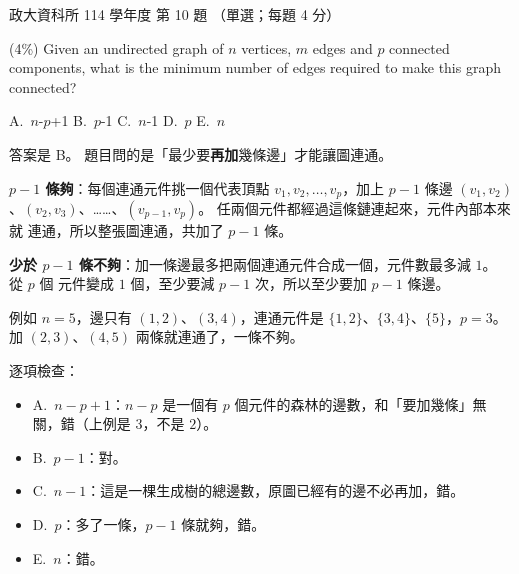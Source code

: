 \begin{pastexam}[label={px:nccu-114-dsa-10}]{政大資科所 114 學年度 第 10 題}
（單選；每題 4 分）

(4\%) Given an undirected graph of $n$ vertices, $m$ edges and $p$ connected components, what is
the minimum number of edges required to make this graph connected?

A.~$n$-$p$+1 \qquad B.~$p$-1 \qquad C.~$n$-1 \qquad D.~$p$ \qquad E.~$n$
\end{pastexam}

\begin{pastsoln}
答案是 B。 題目問的是「最少要\textbf{再加}幾條邊」才能讓圖連通。

\textbf{$p - 1$ 條夠}：每個連通元件挑一個代表頂點 $v_1, v_2, \ldots, v_p$，加上
$p - 1$ 條邊 $(v_1, v_2)$、$(v_2, v_3)$、……、$(v_{p-1}, v_p)$。 任兩個元件都經過這條鏈連起來，元件內部本來就
連通，所以整張圖連通，共加了 $p - 1$ 條。

\textbf{少於 $p - 1$ 條不夠}：加一條邊最多把兩個連通元件合成一個，元件數最多減 $1$。 從 $p$ 個
元件變成 $1$ 個，至少要減 $p - 1$ 次，所以至少要加 $p - 1$ 條邊。

例如 $n = 5$，邊只有 $(1, 2)$、$(3, 4)$，連通元件是 $\{1, 2\}$、$\{3, 4\}$、$\{5\}$，$p = 3$。
加 $(2, 3)$、$(4, 5)$ 兩條就連通了，一條不夠。

逐項檢查：
\begin{itemize}
\item A.~$n - p + 1$：$n - p$ 是一個有 $p$ 個元件的森林的邊數，和「要加幾條」無關，錯（上例是
$3$，不是 $2$）。
\item B.~$p - 1$：對。
\item C.~$n - 1$：這是一棵生成樹的總邊數，原圖已經有的邊不必再加，錯。
\item D.~$p$：多了一條，$p - 1$ 條就夠，錯。
\item E.~$n$：錯。
\end{itemize}
\end{pastsoln}
